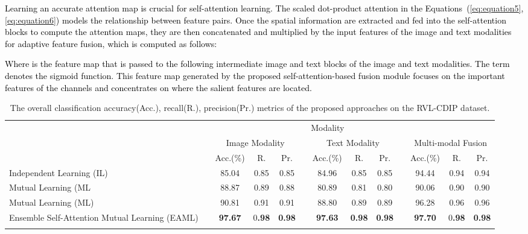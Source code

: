 \documentclass[twocolumn]{svjour3}
\begin{document}
\textcolor{black}{Learning an accurate attention map  is crucial for self-attention learning. The scaled dot-product attention in the Equations~(\ref{eq:equation5}, \ref{eq:equation6}) models the relationship between feature pairs. Once the spatial information are extracted and fed into the self-attention blocks to compute the attention maps, they are then concatenated and multiplied by the input features of the image and text modalities for adaptive feature fusion, which is computed as follows:

Where  is the feature map that is passed to the following intermediate image and text blocks of the image and text modalities. The term  denotes the sigmoid function. This feature map generated by the proposed self-attention-based fusion module focuses on the important features of the channels and concentrates on where the salient features are located.
}
\setlength\tabcolsep{3 pt}
\begin{table*}[tbh]
\small
\centering
\caption{The overall classification accuracy(Acc.), recall(R.), precision(Pr.) metrics of the proposed approaches on the RVL-CDIP dataset.}
\resizebox{\textwidth}{!} {\begin{tabular}{lcccccccccccc}
    \hline\noalign{\smallskip}
     \multicolumn{1}{c}{} && \multicolumn{9}{c}{Modality} \\
         \noalign{\smallskip}\hline\noalign{\smallskip}
         \multicolumn{1}{c}{Method} && \multicolumn{3}{c}{Image Modality} && \multicolumn{3}{c}{Text Modality} && \multicolumn{3}{c}{Multi-modal Fusion} \\
         \noalign{\smallskip}\hline\noalign{\smallskip}
          && Acc.(\%) & R. & Pr. && Acc.(\%) & R. & Pr. && Acc.(\%) & R. & Pr.\\
         \cmidrule{3-5}\cmidrule{7-9}\cmidrule{11-13}
         Independent Learning (IL) && 85.04 & 0.85 & 0.85 && 84.96 & 0.85 & 0.85 && 94.44 & 0.94 & 0.94 \\
         Mutual Learning (ML && 88.87 & 0.89 & 0.88 && 80.89 & 0.81 & 0.80 && 90.06 & 0.90 & 0.90 \\
         Mutual Learning (ML) && 90.81 & 0.91 & 0.91 && 88.80 & 0.89 & 0.89 && 96.28 & 0.96 & 0.96\\
         Ensemble Self-Attention Mutual Learning (EAML) && \textbf{97.67} & 0\textbf{.98} & \textbf{0.98} && \textbf{97.63} & \textbf{0.98} & \textbf{0.98} && \textbf{97.70} & 0\textbf{.98} & \textbf{0.98} \\
    \noalign{\smallskip}\hline
    \end{tabular}}
    \label{tab:proposedmethods}
\end{table*}
\end{document}
